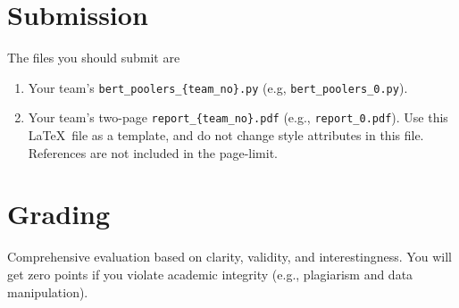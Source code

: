 \documentclass[UTF8]{article}
\begin{document}
\section{Submission}

The files you should submit are
\begin{enumerate}
  \item Your team's \texttt{bert\_poolers\_\{team\_no\}.py} (e.g, \texttt{bert\_poolers\_0.py}).
  \item Your team's two-page \texttt{report\_\{team\_no\}.pdf} (e.g., \texttt{report\_0.pdf}). Use this \LaTeX\ file as a template, and do not change style attributes in this file. References are not included in the page-limit.
\end{enumerate}


\section{Grading}

Comprehensive evaluation based on clarity, validity, and interestingness. You will get zero points if you violate academic integrity (e.g., plagiarism and data manipulation).


\pagebreak


\end{document}
